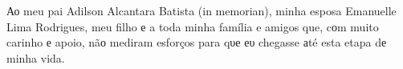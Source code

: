 Ао meu pai Adilson Alcantara Batista (in memorian), minha esposa Emanuelle Lima Rodrigues, meu filho е a toda minha família e amigos que, cоm muito carinho е apoio, nãо mediram esforços para qυе еυ chegasse аté esta etapa dе minha vida.
